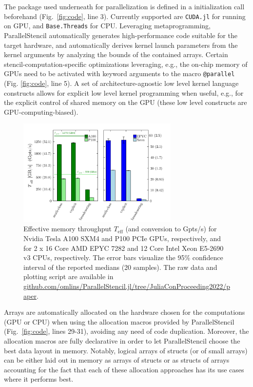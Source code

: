 \documentclass{juliacon}
\begin{document}
The package used underneath for parallelization is defined in a initialization call beforehand (Fig.~\ref{fig:code}, line 3). Currently supported are \texttt{CUDA.jl} \cite{besard2018effective} for running on GPU, and \texttt{Base.Threads} for CPU. Leveraging metaprogramming, ParallelStencil automatically generates high-performance code suitable for the target hardware, and automatically derives kernel launch parameters from the kernel arguments by analyzing the bounds of the contained arrays. Certain stencil-computation-specific optimizations leveraging, e.g., the on-chip memory of GPUs need to be activated with keyword arguments to the macro \texttt{@parallel} (Fig. \ref{fig:code}, line 5). A set of architecture-agnostic low level kernel language constructs allows for explicit low level kernel programming when useful, e.g., for the explicit control of shared memory on the GPU (these low level constructs are GPU-computing-biased).

\begin{figure}[t]
    \centerline{\includegraphics[width=8cm]{julia_xpu_Teff.png}}
    \caption{Effective memory throughput $T_\mathrm{eff}$ (and conversion to Gpts/s) for Nvidia Tesla A100 SXM4 and P100 PCIe GPUs, respectively, and for 2 x 16 Core AMD EPYC 7282 and 12 Core Intel Xeon E5-2690 v3 CPUs, respectively. The error bars visualize the 95\% confidence interval of the reported medians (20 samples). The raw data and plotting script are available in \url{github.com/omlins/ParallelStencil.jl/tree/JuliaConProceeding2022/paper}.}
	\label{fig:performance}
\end{figure}

Arrays are automatically allocated on the hardware chosen for the computations (GPU or CPU) when using the allocation macros provided by ParallelStencil (Fig.~\ref{fig:code}, lines 29-31), avoiding any need of code duplication. Moreover, the allocation macros are fully declarative in order to let ParallelStencil choose the best data layout in memory. Notably, logical arrays of structs (or of small arrays) can be either laid out in memory as arrays of structs or as structs of arrays accounting for the fact that each of these allocation approaches has its use cases where it performs best.
\end{document}
